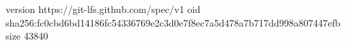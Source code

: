 version https://git-lfs.github.com/spec/v1
oid sha256:fc0cbd6bd14186fc54336769e2c3d0e7f8ec7a5d478a7b717dd998a807447efb
size 43840

